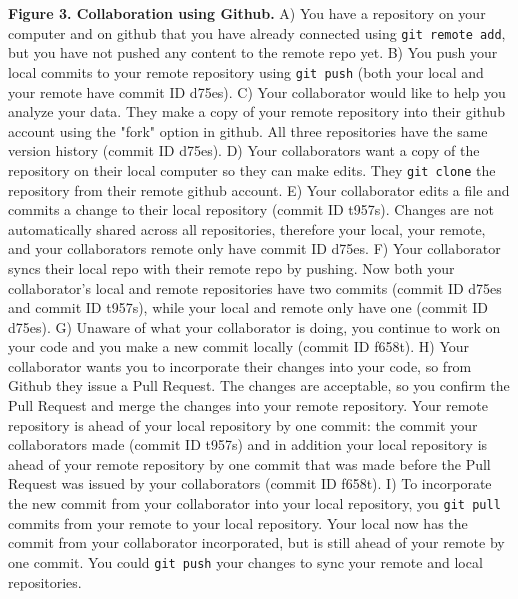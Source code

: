 \textbf{Figure 3. Collaboration using Github.} A) You have a repository on your computer and on github that you have already connected using \verb|git remote add|, but you have not pushed any content to the remote repo yet. B) You push your local commits to your remote repository using \verb|git push| (both your local and your remote have commit ID d75es). C) Your collaborator would like to help you analyze your data. They make a copy of your remote repository into their github account using the "fork" option in github. All three repositories have the same version history (commit ID d75es). D) Your collaborators want a copy of the repository on their local computer so they can make edits. They \verb|git clone| the repository from their remote github account. E) Your collaborator edits a file and commits a change to their local repository (commit ID t957s). Changes are not automatically shared across all repositories, therefore your local, your remote, and your collaborators remote only have commit ID d75es. F) Your collaborator syncs their local repo with their remote repo by pushing. Now both your collaborator's local and remote repositories have two commits (commit ID d75es and commit ID t957s), while your local and remote only have one (commit ID d75es). G) Unaware of what your collaborator is doing, you continue to work on your code and you make a new commit locally (commit ID f658t). H) Your collaborator wants you to incorporate their changes into your code, so from Github they issue a Pull Request. The changes are acceptable, so you confirm the Pull Request and merge the changes into your remote repository. Your remote repository is ahead of your local repository by one commit: the commit your collaborators made (commit ID t957s) and in addition your local repository is ahead of your remote repository by one commit that was made before the Pull Request was issued by your collaborators (commit ID f658t). I) To incorporate the new commit from your collaborator into your local repository, you \verb|git pull| commits from your remote to your local repository. Your local now has the commit from your collaborator incorporated, but is still ahead of your remote by one commit. You could \verb|git push| your changes to sync your remote and local repositories. 